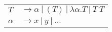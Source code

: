 \documentclass[convert={density=300,size=1080x800,outext=.png}]{standalone}
\begin{document}
\begin{tabular}{l@{ }l}
  $ T $ & $ \rightarrow \alpha \ | \ (T) \ | \ \lambda \alpha. T \ | \ T \ T $ \\
  $ \alpha $ & $ \rightarrow x \ | \ y \ | \ \dots $
\end{tabular}
\end{document}

